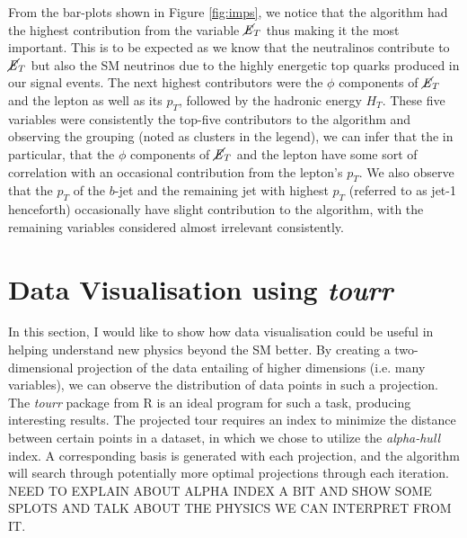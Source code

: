 From the bar-plots shown in Figure \ref{fig:imps}, we notice that the algorithm had the highest contribution from the variable $\cancel{\it{E}}_{T}$ thus making it the most important. This is to be expected as we know that the neutralinos contribute to $\cancel{\it{E}}_{T}$ but also the SM neutrinos due to the highly energetic top quarks produced in our signal events. The next highest contributors were the $\phi$ components of $\cancel{\it{E}}_{T}$ and the lepton as well as its $p_T$, followed by the hadronic energy $H_T$. These five variables were consistently the top-five contributors to the algorithm and observing the grouping (noted as clusters in the legend), we can infer that the in particular, that the $\phi$ components of $\cancel{\it{E}}_{T}$ and the lepton have some sort of correlation with an occasional contribution from the lepton's $p_T$. We also observe that the $p_T$ of the $b$-jet and the remaining jet with highest $p_T$ (referred to as jet-1 henceforth) occasionally have slight contribution to the algorithm, with the remaining variables considered almost irrelevant consistently.
\section{Data Visualisation using \textit{tourr}}

In this section, I would like to show how data visualisation could be useful in helping understand new physics beyond the SM better. By creating a two-dimensional projection of the data entailing of higher dimensions (i.e. many variables), we can observe the distribution of data points in such a projection. The \textit{tourr} package from R \cite{tourr} is an ideal program for such a task, producing interesting results. The projected tour requires an index to minimize the distance between certain points in a dataset, in which we chose to utilize the \textit{alpha-hull} index. A corresponding basis is generated with each projection, and the algorithm will search through potentially more optimal projections through each iteration. NEED TO EXPLAIN ABOUT ALPHA INDEX A BIT AND SHOW SOME SPLOTS AND TALK ABOUT THE PHYSICS WE CAN INTERPRET FROM IT.


